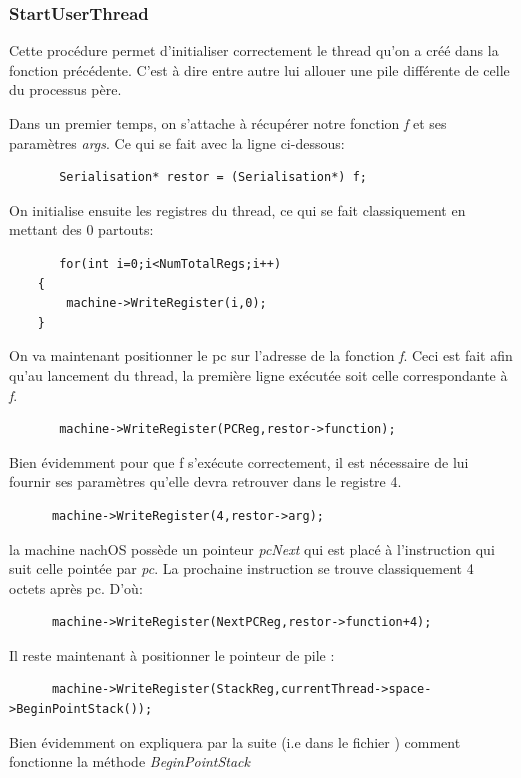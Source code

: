 \documentclass[a4paper,10pt]{article}
\begin{document}
    \subsubsection*{StartUserThread}
      Cette procédure permet d'initialiser correctement le thread qu'on a créé dans la fonction précédente. C'est à dire entre autre lui allouer une pile différente de
      celle du processus père.
      
      Dans un premier temps, on s'attache à récupérer notre fonction \emph{f} et ses paramètres \emph{args}. Ce qui se fait avec la ligne ci-dessous:
      \begin{lstlisting}
       Serialisation* restor = (Serialisation*) f;
      \end{lstlisting}
      
      On initialise ensuite les registres du thread, ce qui se fait classiquement en mettant des 0 partouts:
      \begin{lstlisting}
       for(int i=0;i<NumTotalRegs;i++)
	{
		machine->WriteRegister(i,0);
	}
      \end{lstlisting}
      
      On va maintenant positionner le pc sur l'adresse de la fonction \emph{f}. Ceci est fait afin qu'au lancement du thread, la première ligne exécutée 
      soit celle correspondante à \emph{f}.
      \begin{lstlisting}
       machine->WriteRegister(PCReg,restor->function);
      \end{lstlisting}
      Bien évidemment pour que f s'exécute correctement, il est nécessaire de lui fournir ses paramètres qu'elle devra retrouver dans le registre 4.
      \begin{lstlisting}
      machine->WriteRegister(4,restor->arg);
      \end{lstlisting}
      
      la machine nachOS possède un pointeur \emph{pcNext} qui est placé à l'instruction qui suit celle pointée par \emph{pc}. La prochaine instruction 
      se trouve classiquement 4 octets après pc. D'où:
      \begin{lstlisting}
      machine->WriteRegister(NextPCReg,restor->function+4);
      \end{lstlisting}
      
      Il reste maintenant à positionner le pointeur de pile : 
      \begin{lstlisting}
      machine->WriteRegister(StackReg,currentThread->space->BeginPointStack());
      \end{lstlisting}
      Bien évidemment on expliquera par la suite (i.e dans le fichier ) comment fonctionne la méthode \emph{BeginPointStack}
      
\end{document}
